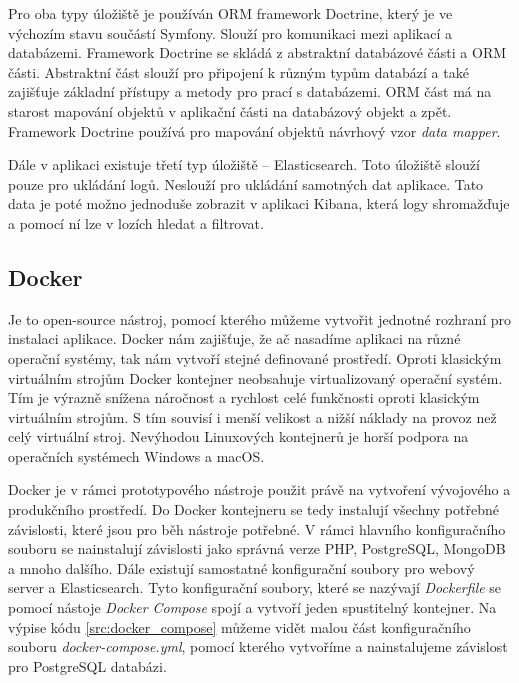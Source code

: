 \documentclass[czech,master]{diploma}
\begin{document}
Pro oba typy úložiště je používán ORM framework Doctrine, který je ve výchozím stavu součástí Symfony. Slouží pro komunikaci mezi aplikací a databázemi. Framework Doctrine se skládá z abstraktní databázové části  a ORM části. Abstraktní část slouží pro připojení k různým typům databází a také zajišťuje základní přístupy a metody pro prací s databázemi. ORM část má na starost mapování objektů v aplikační části na databázový objekt a zpět. Framework Doctrine používá pro mapování objektů návrhový vzor \textit{data mapper}.


Dále v aplikaci existuje třetí typ úložiště -- Elasticsearch. Toto úložiště slouží pouze pro ukládání logů. Neslouží pro ukládání samotných dat aplikace. Tato data je poté možno jednoduše zobrazit v aplikaci Kibana, která logy shromažďuje a pomocí ní lze v lozích hledat a filtrovat.

\subsection{Docker}
\label{sec:docker}
Je to open-source nástroj, pomocí kterého můžeme vytvořit jednotné rozhraní pro instalaci aplikace. Docker nám zajišťuje, že ač nasadíme aplikaci na různé operační systémy, tak nám vytvoří stejné definované prostředí. Oproti klasickým virtuálním strojům Docker kontejner neobsahuje virtualizovaný operační systém. Tím je výrazně snížena náročnost a rychlost celé funkčnosti oproti klasickým virtuálním strojům. S tím souvisí i menší velikost a nižší náklady na provoz než celý virtuální stroj. Nevýhodou Linuxových kontejnerů je horší podpora na operačních systémech Windows a macOS.

Docker je v rámci prototypového nástroje použit právě na vytvoření vývojového a produkčního prostředí. Do Docker kontejneru se tedy instalují všechny potřebné závislosti, které jsou pro běh nástroje potřebné. V rámci hlavního konfiguračního souboru se nainstalují závislosti jako správná verze PHP, PostgreSQL, MongoDB a mnoho dalšího. Dále existují samostatné konfigurační soubory pro webový server a Elasticsearch. Tyto konfigurační soubory, které se nazývají \textit{Dockerfile} se pomocí nástoje \textit{Docker Compose} spojí a vytvoří jeden spustitelný kontejner. Na výpise kódu \ref{src:docker_compose} můžeme vidět malou část konfiguračního souboru \textit{docker-compose.yml}, pomocí kterého vytvoříme a nainstalujeme závislost pro PostgreSQL databázi.


\end{document}
